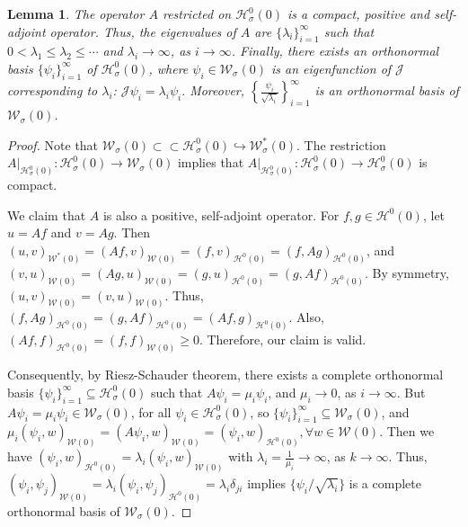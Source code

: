 \documentclass[letterpaper,reqno,10pt,twoside]{amsart}
\newtheorem{lemma}[theorem]{Lemma}
\theoremstyle{definition}
\theoremstyle{remark}
\begin{document}
	\begin{lemma}\label{lem:basis_initial}
		The operator $A$ restricted on $\mathcal{H}_{\sigma}^0(0)$ is a compact, positive and self-adjoint operator. Thus, the eigenvalues of $A$ are $\{\lambda_i\}_{i=1}^\infty$ such that $
		0<\lambda_1\le\lambda_2\le\cdots$
		and
		$\lambda_i\to\infty$, as $ i\to\infty$.
		Finally, there exists an orthonormal basis $\{\psi_i\}_{i=1}^\infty$ of $\mathcal{H}_{\sigma}^0(0)$, where $\psi_i\in \mathcal{W}_{\sigma}(0)$ is an eigenfunction of $\mathcal{J}$  corresponding to $\lambda_i$:
		$
		\mathcal{J}\psi_i=\lambda_i\psi_i.
		$
		Moreover, $\left\{\frac{\psi_i}{\sqrt{\lambda_i}}\right\}_{i=1}^\infty$ is an orthonormal basis of $\mathcal{W}_{\sigma}(0)$.
	\end{lemma}
	\begin{proof}
		Note that $\mathcal{W}_{\sigma}(0)\subset\subset \mathcal{H}_{\sigma}^0(0)\hookrightarrow\mathcal{W}_{\sigma}^\ast(0)$.
		The restriction $A|_{\mathcal{H}_{\sigma}^0(0)}: \mathcal{H}_{\sigma}^0(0)\rightarrow\mathcal{W}_{\sigma}(0)$ implies that $A|_{\mathcal{H}_{\sigma}^0(0)}: \mathcal{H}_{\sigma}^0(0)\rightarrow \mathcal{H}_{\sigma}^0(0)$ is compact.
		
		We claim that $A$ is also a positive, self-adjoint operator.  For $f, g\in \mathcal{H}^0(0)$, let $u=Af$ and $v=Ag$. Then
		$(u, v)_{\mathcal{W}^{*}(0)}=(Af , v)_{\mathcal{W}(0)}=(f, v)_{\mathcal{H}^0(0)}=(f,Ag)_{\mathcal{H}^0(0)}$,
		and
		$(v, u)_{\mathcal{W}(0)}=(Ag , u)_{\mathcal{W}(0)}=(g, u)_{\mathcal{H}^0(0)}=(g,Af)_{\mathcal{H}^0(0)}$.
		By symmetry, $(u, v)_{\mathcal{W}(0)}=(v, u)_{\mathcal{W}(0)}$. Thus,
		$(f,Ag)_{\mathcal{H}^0(0)}=(g,Af)_{\mathcal{H}^0(0)}=(Af, g)_{\mathcal{H}^0(0)}$.
		Also, $(Af, f)_{\mathcal{H}^0(0)}=(f, f)_{\mathcal{W}(0)}\ge0$. Therefore, our claim is valid.
		
		Consequently, by Riesz-Schauder theorem, there exists a complete orthonormal basis $\{\psi_i\}_{i=1}^\infty\subseteq \mathcal{H}_{\sigma}^0(0)$ such that
		$A\psi_i=\mu_i\psi_i$, and $\mu_i\to0$, as $i\to\infty$.
		But
		$A\psi_i=\mu_i\psi_i\in \mathcal{W}_{\sigma}(0)$, for all $\psi_i\in \mathcal{H}_{\sigma}^0(0)$,
		so
		$\{\psi_i\}_{i=1}^\infty\subseteq \mathcal{W}_{\sigma}(0)$,
		and
		$\mu_i(\psi_i, w)_{\mathcal{W}(0)}=(A\psi_i, w)_{\mathcal{W}(0)}=(\psi_i, w)_{\mathcal{H}^0(0)}, \forall w\in \mathcal{W}(0)$.
		Then we have
		$(\psi_i, w)_{\mathcal{H}^{0}(0)}=\lambda_i(\psi_i, w)_{\mathcal{W}(0)}$ with  $\lambda_i=\frac1{\mu_i}\to\infty$, as $k\to\infty$.
		Thus, $(\psi_i, \psi_j)_{\mathcal{W}(0)}=\lambda_i(\psi_i, \psi_j)_{\mathcal{H}^0(0)}=\lambda_i\delta_{ji}$ implies $\{\psi_i/\sqrt{\lambda_i}\}$ is a complete orthonormal basis of $\mathcal{W}_{\sigma}(0)$.
	\end{proof}
	
\end{document}

